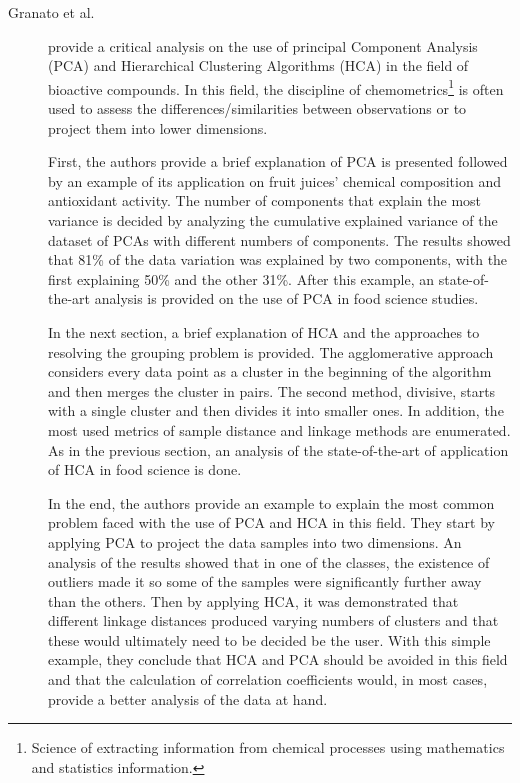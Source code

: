 \begin{description}
    \item[Granato et al.]\cite{Granato.Santos.ea_Useprincipalcomponent_2018} provide a critical analysis on the use of principal Component Analysis (PCA) and Hierarchical Clustering Algorithms (HCA) in the field of bioactive compounds. In this field, the discipline of chemometrics\footnote{Science of extracting information from chemical processes using mathematics and statistics information.} is often used to assess the differences/similarities between observations or to project them into lower dimensions. 
    
    First, the authors provide a brief explanation of PCA is presented followed by an example of its application on fruit juices' chemical composition and antioxidant activity. The number of components that explain the most variance is decided by analyzing the cumulative explained variance of the dataset of PCAs with different numbers of components. The results showed that 81\% of the data variation was explained by two components, with the first explaining 50\% and the other 31\%. After this example, an state-of-the-art analysis is provided on the use of PCA in food science studies.

    In the next section, a brief explanation of HCA and the approaches to resolving the grouping problem is provided.  The agglomerative approach considers every data point as a cluster in the beginning of the algorithm and then merges the cluster in pairs. The second method, divisive, starts with a single cluster and then divides it into smaller ones. In addition, the most used metrics of sample distance and linkage methods are enumerated. As in the previous section, an analysis of the state-of-the-art of application of HCA in food science is done. 
    
    In the end, the authors provide an example to explain the most common problem faced with the use of PCA and HCA in this field. They start by applying PCA to project the data samples into two dimensions. An analysis of the results showed that in one of the classes, the existence of outliers made it so some of the samples were significantly further away than the others. Then by applying HCA, it was demonstrated that different linkage distances produced varying numbers of clusters and that these would ultimately need to be decided be the user. With this simple example, they conclude that HCA and PCA should be avoided in this field and that the calculation of correlation coefficients would, in most cases, provide a better analysis of the data at hand.
\end{description}

